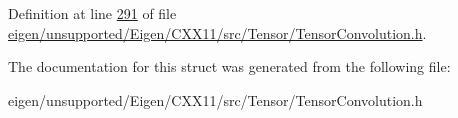 Definition at line \hyperlink{eigen_2unsupported_2_eigen_2_c_x_x11_2src_2_tensor_2_tensor_convolution_8h_source_l00291}{291} of file \hyperlink{eigen_2unsupported_2_eigen_2_c_x_x11_2src_2_tensor_2_tensor_convolution_8h_source}{eigen/unsupported/\+Eigen/\+C\+X\+X11/src/\+Tensor/\+Tensor\+Convolution.\+h}.



The documentation for this struct was generated from the following file\+:\begin{DoxyCompactItemize}
\item 
eigen/unsupported/\+Eigen/\+C\+X\+X11/src/\+Tensor/\+Tensor\+Convolution.\+h\end{DoxyCompactItemize}

